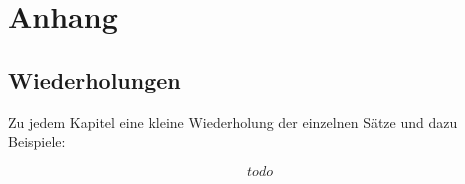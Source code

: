
\chapter*{Anhang}  


\section*{Wiederholungen}  



Zu jedem Kapitel eine kleine Wiederholung der einzelnen Sätze und dazu Beispiele:	%

	\[ todo \]


\newpage